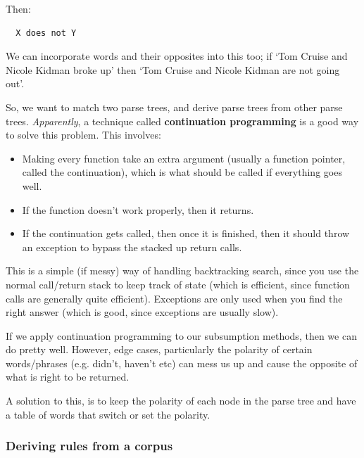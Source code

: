 Then:

\begin{verbatim}
  X does not Y
\end{verbatim}

We can incorporate words and their opposites into this too; if `Tom Cruise and
Nicole Kidman broke up' then `Tom Cruise and Nicole Kidman are not going out'.

So, we want to match two parse trees, and derive parse trees from other parse
trees. \textit{Apparently}, a technique called \textbf{continuation programming}
is a good way to solve this problem. This involves:


\begin{itemize}
  \item Making every function take an extra argument (usually a function 
    pointer, called the continuation), which is what should be called if 
    everything goes well.
  \item If the function doesn't work properly, then it returns.
  \item If the continuation gets called, then once it is finished, then it   
    should throw an exception to bypass the stacked up return calls.
\end{itemize}

This is a simple (if messy) way of handling backtracking search, since you use
the normal call/return stack to keep track of state (which is efficient, since
function calls are generally quite efficient). Exceptions are only used when you
find the right answer (which is good, since exceptions are usually slow).

If we apply continuation programming to our subsumption methods, then we can do
pretty well. However, edge cases, particularly the polarity of certain
words/phrases (e.g. didn't, haven't etc) can mess us up and cause the opposite
of what is right to be returned.

A solution to this, is to keep the polarity of each node in the parse tree and
have a table of words that switch or set the polarity.

\subsubsection{Deriving rules from a corpus}

